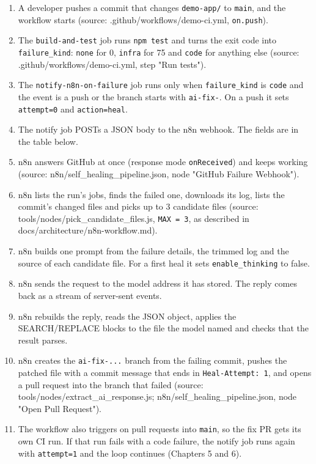 \begin{enumerate}[leftmargin=*, itemsep=2pt]
\item A developer pushes a commit that changes \texttt{demo-\allowbreak{}app/\allowbreak{}} to \texttt{main}, and the workflow starts (source: .github/\allowbreak{}workflows/\allowbreak{}demo-ci.yml, \texttt{on.\allowbreak{}push}).
\item The \texttt{build-\allowbreak{}and-\allowbreak{}test} job runs \texttt{npm test} and turns the exit code into \texttt{failure\_\allowbreak{}kind}: \texttt{none} for 0, \texttt{infra} for 75 and \texttt{code} for anything else (source: .github/\allowbreak{}workflows/\allowbreak{}demo-ci.yml, step "Run tests").
\item The \texttt{notify-\allowbreak{}n8n-\allowbreak{}on-\allowbreak{}failure} job runs only when \texttt{failure\_\allowbreak{}kind} is \texttt{code} and the event is a push or the branch starts with \texttt{ai-\allowbreak{}fix-\allowbreak{}}. On a push it sets \texttt{attempt=0} and \texttt{action=heal}.
\item The notify job POSTs a JSON body to the n8n webhook. The fields are in the table below.
\item n8n answers GitHub at once (response mode \texttt{onReceived}) and keeps working (source: n8n/\allowbreak{}self\_\allowbreak{}healing\_\allowbreak{}pipeline.json, node "GitHub Failure Webhook").
\item n8n lists the run's jobs, finds the failed one, downloads its log, lists the commit's changed files and picks up to 3 candidate files (source: tools/\allowbreak{}nodes/\allowbreak{}pick\_\allowbreak{}candidate\_\allowbreak{}files.js, \texttt{MAX = 3}, as described in docs/\allowbreak{}architecture/\allowbreak{}n8n-workflow.md).
\item n8n builds one prompt from the failure details, the trimmed log and the source of each candidate file. For a first heal it sets \texttt{enable\_\allowbreak{}thinking} to false.
\item n8n sends the request to the model address it has stored. The reply comes back as a stream of server-sent events.
\item n8n rebuilds the reply, reads the JSON object, applies the SEARCH/\allowbreak{}REPLACE blocks to the file the model named and checks that the result parses.
\item n8n creates the \texttt{ai-\allowbreak{}fix-\allowbreak{}.\allowbreak{}.\allowbreak{}.\allowbreak{}} branch from the failing commit, pushes the patched file with a commit message that ends in \texttt{Heal-\allowbreak{}Attempt:\allowbreak{} 1}, and opens a pull request into the branch that failed (source: tools/\allowbreak{}nodes/\allowbreak{}extract\_\allowbreak{}ai\_\allowbreak{}response.js; n8n/\allowbreak{}self\_\allowbreak{}healing\_\allowbreak{}pipeline.json, node "Open Pull Request").
\item The workflow also triggers on pull requests into \texttt{main}, so the fix PR gets its own CI run. If that run fails with a code failure, the notify job runs again with \texttt{attempt=1} and the loop continues (Chapters 5 and 6).
\end{enumerate}

